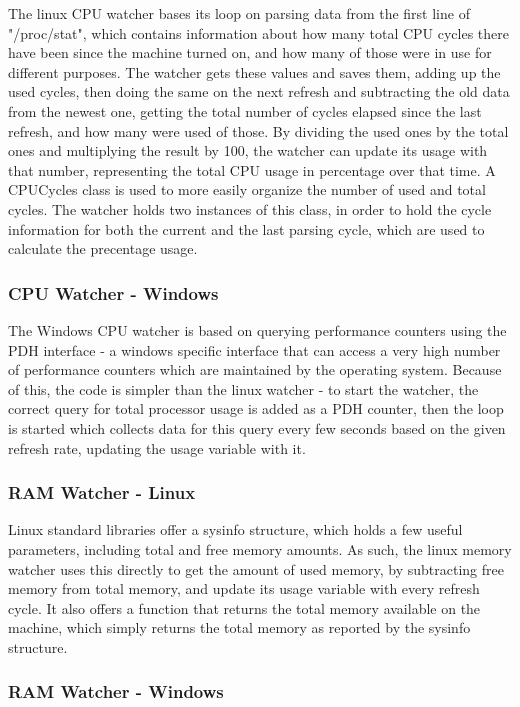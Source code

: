 \documentclass{l3proj}
\begin{document}
The linux CPU watcher bases its loop on parsing data from the first line of "/proc/stat", which contains information about how many total CPU cycles there have been since the machine turned on, and how many of those were in use for different purposes. The watcher gets these values and saves them, adding up the used cycles, then doing the same on the next refresh and subtracting the old data from the newest one, getting the total number of cycles elapsed since the last refresh, and how many were used of those. By dividing the used ones by the total ones and multiplying the result by 100, the watcher can update its usage with that number, representing the total CPU usage in percentage over that time.
A CPUCycles class is used to more easily organize the number of used and total cycles. The watcher holds two instances of this class, in order to hold the cycle information for both the current and the last parsing cycle, which are used to calculate the precentage usage.

\subsubsection{CPU Watcher - Windows}

The Windows CPU watcher is based on querying performance counters using the PDH interface - a windows specific interface that can access a very high number of performance counters which are maintained by the operating system. Because of this, the code is simpler than the linux watcher - to start the watcher, the correct query for total processor usage is added as a PDH counter, then the loop is started which collects data for this query every few seconds based on the given refresh rate, updating the usage variable with it.

\subsubsection{RAM Watcher - Linux}

Linux standard libraries offer a sysinfo structure, which holds a few useful parameters, including total and free memory amounts. As such, the linux memory watcher uses this directly to get the amount of used memory, by subtracting free memory from total memory, and update its usage variable with every refresh cycle. It also offers a function that returns the total memory available on the machine, which simply returns the total memory as reported by the sysinfo structure.

\subsubsection{RAM Watcher - Windows}
\end{document}
